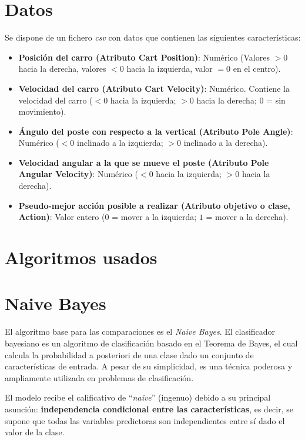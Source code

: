 \documentclass[12pt,letterpaper]{article}
\begin{document}
\section{Datos}
Se dispone de un fichero \textit{csv} con datos que contienen las siguientes características:

\begin{itemize}
    \item \textbf{Posición del carro (Atributo Cart Position)}: Numérico (Valores $>0$ hacia la derecha, valores $<0$ hacia la izquierda, valor $=0$ en el centro).

    \item \textbf{Velocidad del carro (Atributo Cart Velocity)}: Numérico. Contiene la velocidad del carro ($<0$ hacia la izquierda; $>0$ hacia la derecha; $0$ = sin movimiento).

    \item \textbf{Ángulo del poste con respecto a la vertical (Atributo Pole Angle)}: Numérico ($<0$ inclinado a la izquierda; $>0$ inclinado a la derecha).

    \item \textbf{Velocidad angular a la que se mueve el poste (Atributo Pole Angular Velocity)}: Numérico ($<0$ hacia la izquierda; $>0$ hacia la derecha).

    \item \textbf{Pseudo-mejor acción posible a realizar (Atributo objetivo o clase, Action)}: Valor entero ($0$ = mover a la izquierda; $1$ = mover a la derecha).
\end{itemize}

\section{Algoritmos usados}
\section{Naive Bayes}
El algoritmo base para las comparaciones es el \textit{Naive Bayes}. El clasificador bayesiano es un algoritmo de clasificación basado en el Teorema de Bayes, el cual calcula la probabilidad a posteriori de una clase dado un conjunto de características de entrada. A pesar de su simplicidad, es una técnica poderosa y ampliamente utilizada en problemas de clasificación.

El modelo recibe el calificativo de ``\textit{naive}'' (ingenuo) debido a su principal asunción: \textbf{independencia condicional entre las características}, es decir, se supone que todas las variables predictoras son independientes entre sí dado el valor de la clase.
\end{document}
